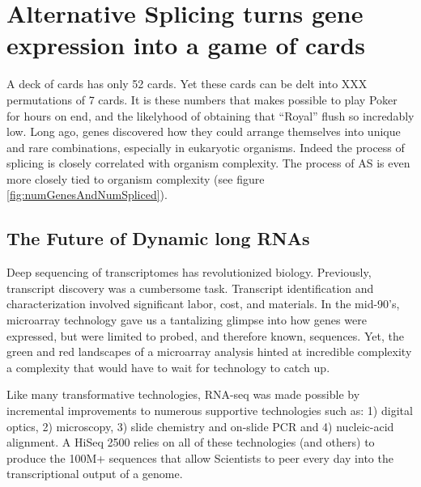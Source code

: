\section{Alternative Splicing turns gene expression into a game of cards}

    A deck of cards has only 52 cards. Yet these cards can be delt into XXX permutations of 7 cards. It is these numbers that makes possible to play Poker for hours on end, and the likelyhood of obtaining that ``Royal'' flush so incredably low. Long ago, genes discovered how they could arrange themselves into unique and rare combinations, especially in eukaryotic organisms. Indeed the process of splicing is closely correlated with organism complexity. The process of AS is even more closely tied to organism complexity (see figure \ref{fig:numGenesAndNumSpliced}). 


\subsection{The Future of Dynamic long RNAs}

    Deep sequencing of transcriptomes has revolutionized biology. Previously, transcript discovery was a cumbersome task. Transcript identification and characterization involved significant labor, cost, and materials. In the mid-90's, microarray technology \citep{Schena1995a} gave us a tantalizing glimpse into how genes were expressed, but were limited to probed, and therefore known, sequences. Yet, the green and red landscapes of a microarray analysis hinted at incredible complexity \textemdash a complexity that would have to wait for technology to catch up.

    Like many transformative technologies, RNA-seq was made possible by incremental improvements to numerous supportive technologies such as: 1) digital optics, 2) microscopy, 3) slide chemistry and on-slide PCR and 4) nucleic-acid alignment. A HiSeq 2500 relies on all of these technologies (and others) to produce the 100M+ sequences that allow Scientists to peer every day into the transcriptional output of a genome.

